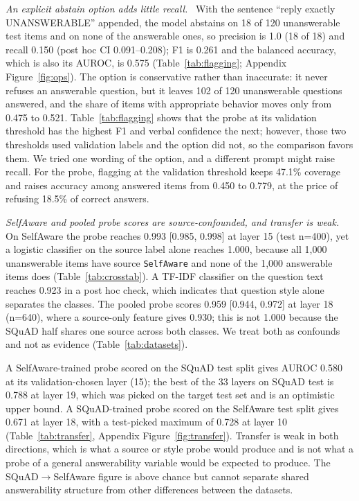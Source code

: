\documentclass[10pt]{article}
\renewcommand{\paragraph}[1]{\par\vspace{0.3em}\noindent\textit{#1}\ }
\newcommand{\code}[1]{\texttt{#1}}
\begin{document}
\paragraph{An explicit abstain option adds little recall.}
With the sentence ``reply exactly UNANSWERABLE'' appended, the model abstains on 18 of 120 unanswerable test items and on none of the answerable ones, so precision is 1.0 (18 of 18) and recall 0.150 (post hoc CI 0.091--0.208); F1 is 0.261 and the balanced accuracy, which is also its AUROC, is 0.575 (Table~\ref{tab:flagging}; Appendix Figure~\ref{fig:ops}). The option is conservative rather than inaccurate: it never refuses an answerable question, but it leaves 102 of 120 unanswerable questions answered, and the share of items with appropriate behavior moves only from 0.475 to 0.521. Table~\ref{tab:flagging} shows that the probe at its validation threshold has the highest F1 and verbal confidence the next; however, those two thresholds used validation labels and the option did not, so the comparison favors them. We tried one wording of the option, and a different prompt might raise recall. For the probe, flagging at the validation threshold keeps 47.1\% coverage and raises accuracy among answered items from 0.450 to 0.779, at the price of refusing 18.5\% of correct answers.



\paragraph{SelfAware and pooled probe scores are source-confounded, and transfer is weak.}
On SelfAware the probe reaches 0.993 [0.985, 0.998] at layer 15 (test n=400), yet a logistic classifier on the source label alone reaches 1.000, because all 1,000 unanswerable items have source \code{SelfAware} and none of the 1,000 answerable items does (Table~\ref{tab:crosstab}). A TF-IDF classifier on the question text reaches 0.923 in a post hoc check, which indicates that question style alone separates the classes. The pooled probe scores 0.959 [0.944, 0.972] at layer 18 (n=640), where a source-only feature gives 0.930; this is not 1.000 because the SQuAD half shares one source across both classes. We treat both as confounds and not as evidence (Table~\ref{tab:datasets}).

A SelfAware-trained probe scored on the SQuAD test split gives AUROC 0.580 at its validation-chosen layer (15); the best of the 33 layers on SQuAD test is 0.788 at layer 19, which was picked on the target test set and is an optimistic upper bound. A SQuAD-trained probe scored on the SelfAware test split gives 0.671 at layer 18, with a test-picked maximum of 0.728 at layer 10 (Table~\ref{tab:transfer}, Appendix Figure~\ref{fig:transfer}). Transfer is weak in both directions, which is what a source or style probe would produce and is not what a probe of a general answerability variable would be expected to produce. The SQuAD$\to$SelfAware figure is above chance but cannot separate shared answerability structure from other differences between the datasets.
\end{document}
